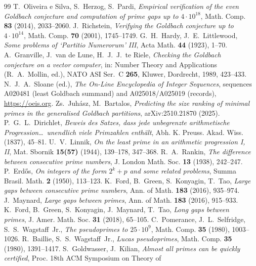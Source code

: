 \documentclass[11pt,oneside]{book}
\theoremstyle{plain}
\theoremstyle{definition}
\theoremstyle{remark}
\begin{document}
\backmatter
\begin{thebibliography}{99}
 T.~Oliveira e Silva, S.~Herzog, S.~Pardi, \emph{Empirical
verification of the even Goldbach conjecture and computation of prime gaps up to
$4\cdot10^{18}$}, Math. Comp. \textbf{83} (2014), 2033--2060.
 J.~Richstein, \emph{Verifying the Goldbach conjecture up to
$4\cdot10^{14}$}, Math. Comp. \textbf{70} (2001), 1745--1749.
 G.~H.~Hardy, J.~E.~Littlewood, \emph{Some problems of `Partitio
Numerorum' III}, Acta Math. \textbf{44} (1923), 1--70.
 A.~Granville, J.~van de Lune, H.~J.~J.~te Riele, \emph{Checking
the Goldbach conjecture on a vector computer}, in: Number Theory and Applications
(R.~A.~Mollin, ed.), NATO ASI Ser.~C \textbf{265}, Kluwer, Dordrecht, 1989,
423--433.
 N.~J.~A.~Sloane (ed.), \emph{The On-Line Encyclopedia of Integer
Sequences}, sequences A020481 (least Goldbach summand) and A025018/A025019
(records), \url{https://oeis.org}.
 Zs.~Juh\'asz, M.~Bartalos, \emph{Predicting the size ranking of
minimal primes in the generalised Goldbach partitions}, arXiv:2510.21870 (2025).
 P.~G.~L.~Dirichlet, \emph{Beweis des Satzes, dass jede
unbegrenzte arithmetische Progression\dots\ unendlich viele Primzahlen
enth\"alt}, Abh. K. Preuss. Akad. Wiss. (1837), 45--81.
 U.~V.~Linnik, \emph{On the least prime in an arithmetic
progression I, II}, Mat. Sbornik \textbf{15(57)} (1944), 139--178, 347--368.
 R.~A.~Rankin, \emph{The difference between consecutive prime
numbers}, J. London Math. Soc. \textbf{13} (1938), 242--247.
 P.~Erd\H{o}s, \emph{On integers of the form $2^k+p$ and
some related problems}, Summa Brasil. Math. \textbf{2} (1950), 113--123.
 K.~Ford, B.~Green, S.~Konyagin, T.~Tao, \emph{Large gaps between
consecutive prime numbers}, Ann. of Math. \textbf{183} (2016), 935--974.
 J.~Maynard, \emph{Large gaps between primes}, Ann. of Math.
\textbf{183} (2016), 915--933.
 K.~Ford, B.~Green, S.~Konyagin, J.~Maynard, T.~Tao, \emph{Long
gaps between primes}, J. Amer. Math. Soc. \textbf{31} (2018), 65--105.
 C.~Pomerance, J.~L.~Selfridge, S.~S.~Wagstaff~Jr., \emph{The
pseudoprimes to $25\cdot10^9$}, Math. Comp. \textbf{35} (1980), 1003--1026.
 R.~Baillie, S.~S.~Wagstaff~Jr., \emph{Lucas pseudoprimes},
Math. Comp. \textbf{35} (1980), 1391--1417.
 S.~Goldwasser, J.~Kilian, \emph{Almost all
primes can be quickly certified}, Proc. 18th ACM Symposium on Theory of

\end{thebibliography}
\end{document}
